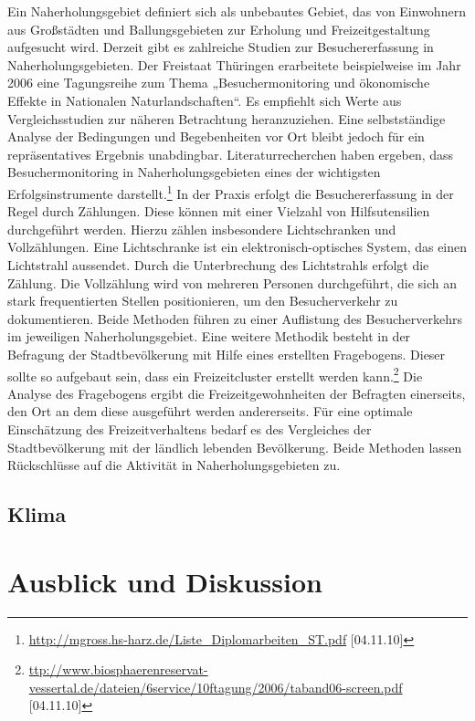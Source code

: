 \documentclass[12pt]{article}
\newcommand{\citefooturldate}[2]{\footnote{\url{#1} [#2]}}
\begin{document}
\noindent Ein Naherholungsgebiet definiert sich als unbebautes Gebiet, das von Einwohnern aus Großstädten und Ballungsgebieten 
zur Erholung und Freizeitgestaltung aufgesucht wird. 
Derzeit gibt es zahlreiche Studien zur  Besuchererfassung in Naherholungsgebieten. Der Freistaat Thüringen erarbeitete 
beispielweise im Jahr 2006 eine Tagungsreihe zum Thema „Besuchermonitoring und ökonomische Effekte in Nationalen 
Naturlandschaften“. Es empfiehlt sich Werte aus Vergleichsstudien zur näheren Betrachtung heranzuziehen. Eine 
selbstständige Analyse der Bedingungen und Begebenheiten vor Ort bleibt jedoch für ein repräsentatives Ergebnis unabdingbar.
Literaturrecherchen haben ergeben, dass Besuchermonitoring in Naherholungsgebieten eines der wichtigsten Erfolgsinstrumente 
darstellt.\citefooturldate{http://mgross.hs-harz.de/Liste_Diplomarbeiten_ST.pdf}{04.11.10} In der Praxis erfolgt die 
Besuchererfassung in der Regel durch Zählungen. Diese können mit einer Vielzahl von 
Hilfsutensilien durchgeführt werden. Hierzu zählen insbesondere Lichtschranken und Vollzählungen. Eine Lichtschranke ist ein 
elektronisch-optisches System, das einen Lichtstrahl aussendet. Durch die Unterbrechung des Lichtstrahls erfolgt die 
Zählung. Die Vollzählung wird von mehreren Personen durchgeführt, die sich an stark frequentierten Stellen positionieren, 
um den Besucherverkehr zu dokumentieren. Beide Methoden führen zu einer Auflistung des Besucherverkehrs im jeweiligen 
Naherholungsgebiet. 
Eine weitere Methodik besteht in der Befragung der Stadtbevölkerung mit Hilfe eines erstellten Fragebogens. Dieser sollte 
so aufgebaut sein, dass ein Freizeitcluster erstellt werden 
kann.\citefooturldate{ttp://www.biosphaerenreservat-vessertal.de/dateien/6service/10ftagung/2006/taband06-screen.pdf}{04.11.10} 
Die Analyse des Fragebogens ergibt die 
Freizeitgewohnheiten der Befragten einerseits, den Ort an dem diese ausgeführt werden andererseits. Für eine optimale 
Einschätzung des Freizeitverhaltens bedarf es des Vergleiches der Stadtbevölkerung mit der ländlich lebenden Bevölkerung. 
Beide Methoden lassen Rückschlüsse auf die Aktivität in Naherholungsgebieten zu. 
\subsection{Klima}

\section{Ausblick und Diskussion}
\end{document}
